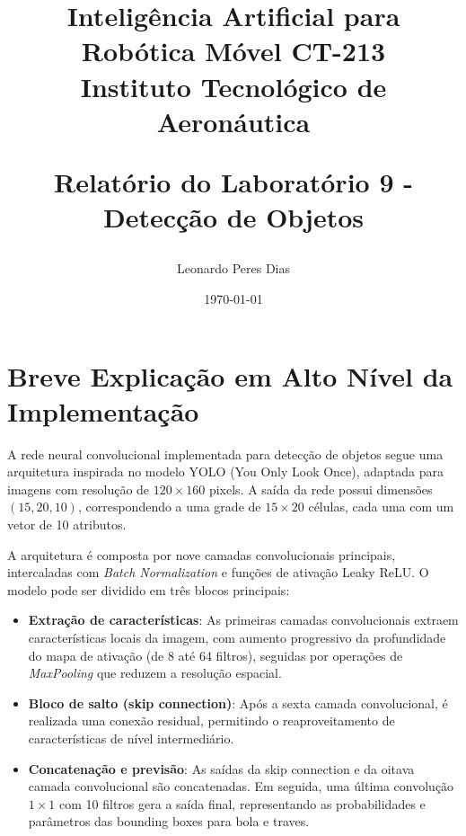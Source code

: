 \documentclass[a4paper,12pt]{article}
\title{
    \textbf{Inteligência Artificial para Robótica Móvel CT-213}\\
    \Large Instituto Tecnológico de Aeronáutica 

    \textbf{Relatório do Laboratório 9 - Detecção de Objetos}\\
}
\author{
    Leonardo Peres Dias 
}
\date{\today}
\begin{document}
\BgThispage
\maketitle
\thispagestyle{empty} %


\newpage
\NoBgThispage %

\tableofcontents

\newpage
\NoBgThispage %

\section{Breve Explicação em Alto Nível da Implementação}

A rede neural convolucional implementada para detecção de objetos segue uma arquitetura inspirada no modelo YOLO (You Only Look Once), adaptada para imagens com resolução de $120 \times 160$ pixels. A saída da rede possui dimensões $(15, 20, 10)$, correspondendo a uma grade de $15 \times 20$ células, cada uma com um vetor de 10 atributos.

A arquitetura é composta por nove camadas convolucionais principais, intercaladas com \textit{Batch Normalization} e funções de ativação Leaky ReLU. O modelo pode ser dividido em três blocos principais:

\begin{itemize}
    \item \textbf{Extração de características}: As primeiras camadas convolucionais extraem características locais da imagem, com aumento progressivo da profundidade do mapa de ativação (de 8 até 64 filtros), seguidas por operações de \textit{MaxPooling} que reduzem a resolução espacial.

    \item \textbf{Bloco de salto (skip connection)}: Após a sexta camada convolucional, é realizada uma conexão residual, permitindo o reaproveitamento de características de nível intermediário.

    \item \textbf{Concatenação e previsão}: As saídas da skip connection e da oitava camada convolucional são concatenadas. Em seguida, uma última convolução $1 \times 1$ com 10 filtros gera a saída final, representando as probabilidades e parâmetros das bounding boxes para bola e traves.
\end{itemize}
\end{document}
